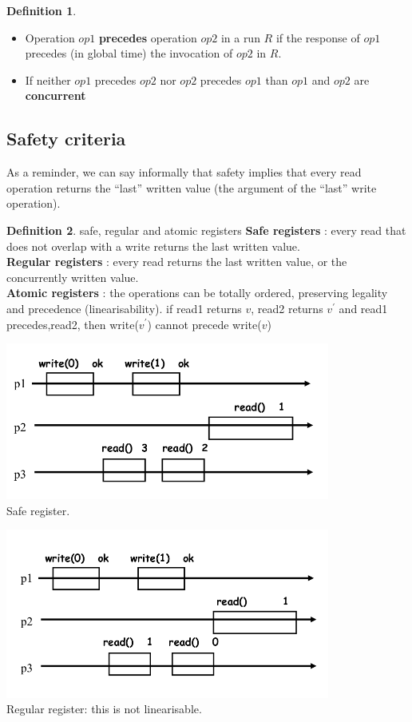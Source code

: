 \documentclass{article}
\theoremstyle{definition}
\newtheorem{definition}{Definition}[section]
\begin{document}
\begin{definition}
\begin{itemize}
	\item Operation $op1$ \textbf{precedes} operation $op2$ in a run $R$ if the response of $op1$ precedes (in global time) the invocation of $op2$ in $R$.
	\item If neither $op1$ precedes $op2$ nor $op2$ precedes $op1$ than $op1$ and $op2$ are \textbf{concurrent}
\end{itemize}
\end{definition}

\subsection{Safety criteria}

As a reminder, we can say informally that safety implies that every read operation returns the “last” written value (the argument of the “last” write operation).

\begin{definition}{safe, regular and atomic registers}
\textbf{Safe registers} : every read that does not overlap with a write returns the last written value. \\
\textbf{Regular registers} : every read returns the last written value, or the concurrently written value. \\ 
\textbf{Atomic registers} : the operations can be totally ordered, preserving legality and precedence (linearisability). if read1 returns $v$, read2 returns $v^{'}$ and read1 precedes,read2, then write($v^{'}$) cannot precede write($v$) 
\end{definition}

\begin{center}
\includegraphics[width=0.8\textwidth]{c3_p1}\\
Safe register.
\end{center}

\begin{center}
\includegraphics[width=0.8\textwidth]{c3_p2}\\
Regular register: this is not linearisable.
\end{center}
\end{document}
